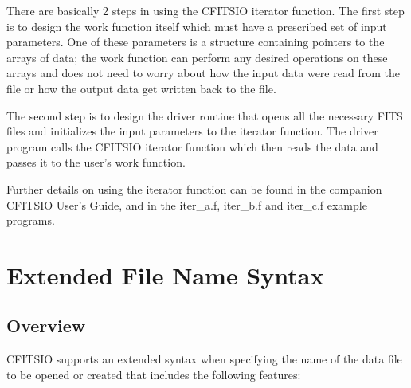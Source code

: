 \documentclass[11pt]{book}
\begin{document}
There are basically 2 steps in using the CFITSIO iterator function.
The first step is to design the work function itself which must have a
prescribed set of input parameters.  One of these parameters is a
structure containing pointers to the arrays of data; the work function
can perform any desired operations on these arrays and does not need to
worry about how the input data were read from the file or how the
output data get written back to the file.

The second step is to design the driver routine that opens all the
necessary FITS files and initializes  the input parameters to the
iterator function.  The driver program calls the CFITSIO iterator
function which then reads the data and passes it to the user's work
function.

Further details on using the iterator function can be found in the
companion CFITSIO User's Guide, and in the iter\_a.f, iter\_b.f and
iter\_c.f example programs.



\chapter{  Extended File Name Syntax }


\section{Overview}

CFITSIO supports an extended syntax when specifying the name of the
data file to be opened or created  that includes the following
features:
\end{document}
